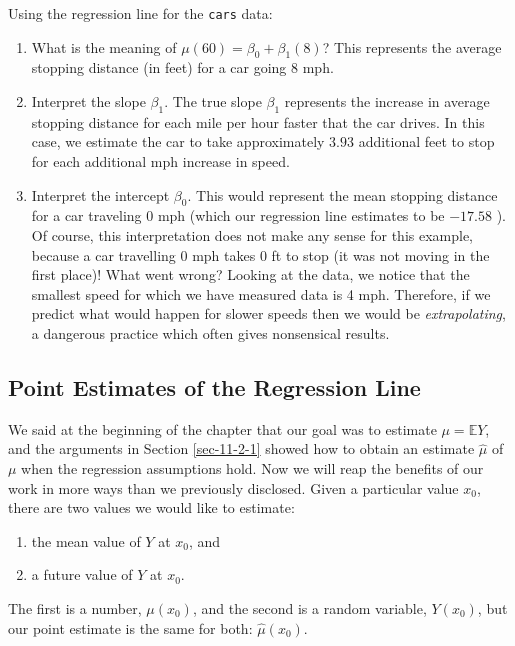 \documentclass[captions=tableheading]{scrbook}
\begin{document}
\begin{example}

Using the regression line for the \texttt{cars} data:

\begin{enumerate}
\item What is the meaning of \( \mu(60) = \beta_{0} + \beta_{1}(8) \)? 
   This represents the average stopping distance (in feet) for a car going 8 mph.
\item Interpret the slope \(\beta_{1}\). 
   The true slope \(\beta_{1}\) represents the increase in average stopping distance for each mile per hour faster that the car drives. In this case, we estimate the car to take approximately \(  3.93 \) additional feet to stop for each additional mph increase in speed.
\item Interpret the intercept \( \beta_{0} \).
   This would represent the mean stopping distance for a car traveling 0 mph (which our regression line estimates to be \(  -17.58 \) ). Of course, this interpretation does not make any sense for this example, because a car travelling 0 mph takes 0 ft to stop (it was not moving in the first place)! What went wrong? Looking at the data, we notice that the smallest speed for which we have measured data is 4 mph. Therefore, if we predict what would happen for slower speeds then we would be \emph{extrapolating}, a dangerous practice which often gives nonsensical results.
\end{enumerate}
\end{example}
\subsection{Point Estimates of the Regression Line}
\label{sec-11-2-2}
\label{sub-slr-point-est-regline}


We said at the beginning of the chapter that our goal was to estimate \( \mu = \mathbb{E} Y \), and the arguments in Section \ref{sec-11-2-1} showed how to obtain an estimate \( \hat{\mu} \) of \( \mu \) when the regression assumptions hold. Now we will reap the benefits of our work in more ways than we previously disclosed. Given a particular value \(x_{0}\), there are two values we would like to estimate:
\begin{enumerate}
\item the mean value of \(Y\) at \(x_{0}\), and
\item a future value of \(Y\) at \(x_{0}\).
\end{enumerate}
The first is a number, \(\mu(x_{0})\), and the second is a random variable, \(Y(x_{0})\), but our point estimate is the same for both: \(\hat{\mu}(x_{0})\).
\end{document}

